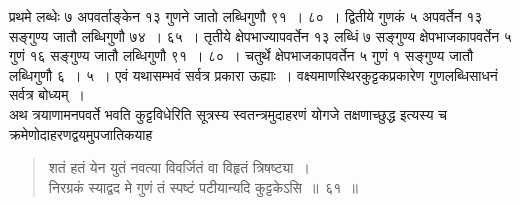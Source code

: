 \documentclass[11pt, openany]{book}
\begin{document}
{{\noindent प्रथमे लब्धेः ७ अपवर्ताङ्केन १३ गुणने जातो लब्धिगुणौ ९१~। ८०~। द्वितीये
गुणकं ५ अपवर्तेन १३ सङ्गुण्य जातौ लब्धिगुणौ ७४~। ६५~। तृतीये क्षेपभाज्यापवर्तेन १३ लब्धिं ७ सङ्गुण्य क्षेपभाजकापवर्तेन ५ गुणं १६ सङ्गुण्य
जातौ 
लब्धिगुणौ ९१~। ८०~। चतुर्थे क्षेपभाजकापवर्तेन ५ गुणं १ सङ्गुण्य जातौ
लब्धिगुणौ ६~। ५~। एवं यथासम्भवं सर्वत्र प्रकारा ऊह्याः~।
वक्ष्यमाणस्थिरकुट्टकप्रकारेण गुणलब्धिसाधनं सर्वत्र बोध्यम्~। \\

\vspace{-4mm}
 अथ त्रयाणामनपवर्ते भवति कुट्टविधेरिति सूत्रस्य स्वतन्त्रमुदाहरणं योगजे
तक्षणाच्छुद्ध इत्यस्य च क्रमेणोदाहरणद्वयमुपजातिकयाह\textendash

 \label{61}
\begin{quote}
    \eg 
     शतं हतं येन युतं नवत्या विवर्जितं वा विहृतं त्रिषष्ट्या~। \\
 निरग्रकं स्याद्वद मे गुणं तं स्पष्टं पटीयान्यदि कुट्टकेऽसि~॥~६१~॥
\end{quote}
 
}}
\end{document}
